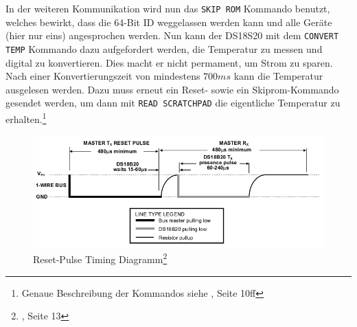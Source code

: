 In der weiteren Kommunikation wird nun das \texttt{SKIP ROM} Kommando benutzt, welches bewirkt, dass die 64-Bit ID weggelassen werden kann und alle Geräte (hier nur eins) angesprochen werden. Nun kann der DS18S20 mit dem \texttt{CONVERT TEMP} Kommando dazu aufgefordert werden, die Temperatur zu messen und digital zu konvertieren. Dies macht er nicht permament, um Strom zu sparen. Nach einer Konvertierungszeit von mindestens $700 ms$ kann die Temperatur ausgelesen werden. Dazu muss erneut ein Reset- sowie ein Skiprom-Kommando gesendet werden, um dann mit \texttt{READ SCRATCHPAD} die eigentliche Temperatur zu erhalten.\footnote{Genaue Beschreibung der Kommandos siehe \cite{ds18s20}, Seite 10ff}
%
\begin{figure}[htp]
\centering
\centerline{\includegraphics[width=\linewidth]{skizzen/temperatur_reset.png}}
\caption{Reset-Pulse Timing Diagramm\footnote{\cite{ds18s20}, Seite
13}}\label{fig_resettiming}
\end{figure}
%
